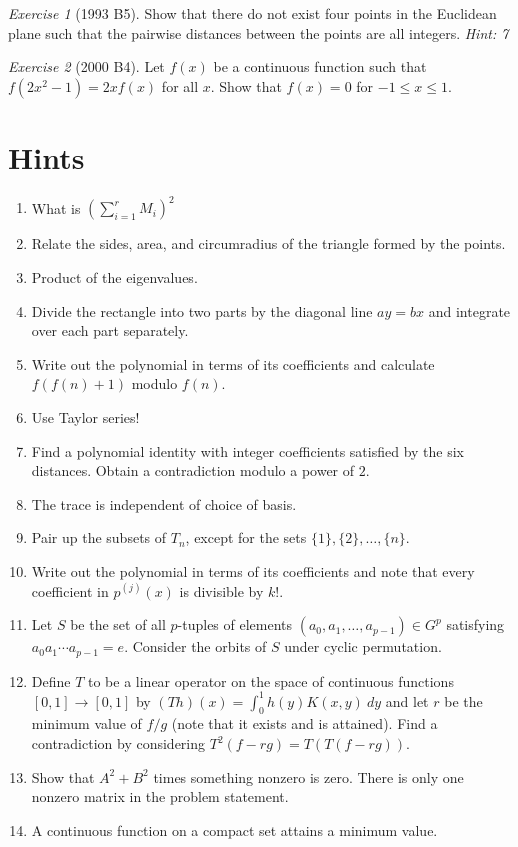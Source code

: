 \documentclass{article}
\theoremstyle{definition}
\theoremstyle{remark}
\newtheorem{exercise}{Exercise}
\begin{document}
\begin{exercise}[1993 B5]
Show that there do not exist four points in the Euclidean plane such that the pairwise distances between the points are all integers. \emph{Hint: 7} 
\end{exercise}

\begin{exercise}[2000 B4]
Let $f(x)$ be a continuous function such that $f(2x^{2} - 1) = 2xf(x)$ for all $x$. Show that $f(x) = 0$ for $-1 \leq x \leq 1$. 
\end{exercise}

\pagebreak
\section{Hints}
\begin{enumerate}[label=\textbf{\arabic*.}]
    \item What is $\left(\sum_{i=1}^r M_i\right)^2$
    \item Relate the sides, area, and circumradius of the triangle formed by the points.
    \item Product of the eigenvalues.
    \item Divide the rectangle into two parts by the diagonal line $ay=bx$ and integrate over each part separately.
    \item Write out the polynomial in terms of its coefficients and calculate $f(f(n)+1)$ modulo $f(n)$.
    \item Use Taylor series!
    \item Find a polynomial identity with integer coefficients satisfied by the six distances. Obtain a contradiction modulo a power of $2$. 
    \item The trace is independent of choice of basis.
    \item Pair up the subsets of $T_n$, except for the sets $\{1\},\{2\},\dots,\{n\}$.
    \item Write out the polynomial in terms of its coefficients and note that every coefficient in $p^{(j)}(x)$ is divisible by $k!$.
    \item Let $S$ be the set of all $p$-tuples of elements $(a_0,a_1,\dots,a_{p-1})\in G^p$ satisfying $a_0a_1\cdots a_{p-1}=e$. Consider the orbits of $S$ under cyclic permutation.
    \item Define $T$ to be a linear operator on the space of continuous functions $[0,1]\to [0,1]$ by $(Th)(x)=\int_0^1 h(y)K(x,y)\ dy$ and let $r$ be the minimum value of $f/g$ (note that it exists and is attained). Find a contradiction by considering $T^2(f-rg)=T(T(f-rg))$.
    \item Show that $A^2+B^2$ times something nonzero is zero. There is only one nonzero matrix in the problem statement.
    \item A continuous function on a compact set attains a minimum value.
\end{enumerate}
\end{document}
